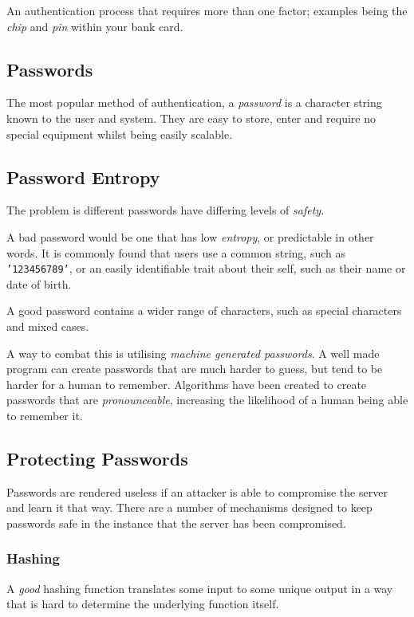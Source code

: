 \documentclass{article}
\begin{document}
An authentication process that requires more than one factor; examples being the \textit{chip} and \textit{pin} within your bank card.

\subsection{Passwords}

The most popular method of authentication, a \textit{password} is a character string known to the user and system. They are easy to store, enter and require no special equipment whilst being easily scalable.

\subsection{Password Entropy}

The problem is different passwords have differing levels of \textit{safety}.

A bad password would be one that has low \textit{entropy}, or predictable in other words. It is commonly found that users use a common string, such as \texttt{'123456789'}, or an easily identifiable trait about their self, such as their name or date of birth.

A good password contains a wider range of characters, such as special characters and mixed cases.

A way to combat this is utilising \textit{machine generated passwords}. A well made program can create passwords that are much harder to guess, but tend to be harder for a human to remember. Algorithms have been created to create passwords that are \textit{pronounceable}, increasing the likelihood of a human being able to remember it.

\subsection{Protecting Passwords}

Passwords are rendered useless if an attacker is able to compromise the server and learn it that way. There are a number of mechanisms designed to keep passwords safe in the instance that the server has been compromised.

\subsubsection{Hashing}

A \textit{good} hashing function translates some input to some unique output in a way that is hard to determine the underlying function itself.
\end{document}
